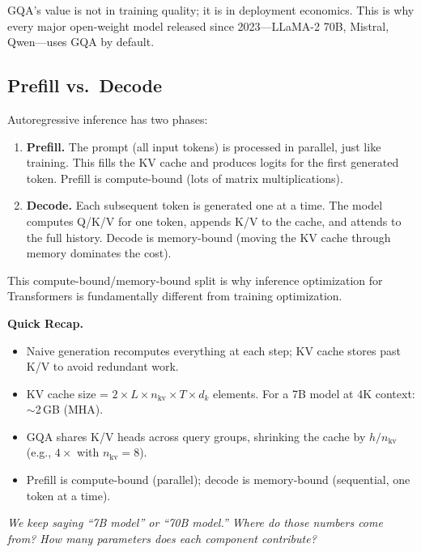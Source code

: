 GQA's value is not in training quality; it is in deployment economics. This is why every major open-weight model released since 2023---LLaMA-2 70B, Mistral, Qwen---uses GQA by default.

\subsection{Prefill vs.\ Decode}

Autoregressive inference has two phases:

\begin{enumerate}[nosep]
  \item \textbf{Prefill.} The prompt (all input tokens) is processed in parallel, just like training. This fills the KV cache and produces logits for the first generated token. Prefill is compute-bound (lots of matrix multiplications).
  \item \textbf{Decode.} Each subsequent token is generated one at a time. The model computes Q/K/V for one token, appends K/V to the cache, and attends to the full history. Decode is memory-bound (moving the KV cache through memory dominates the cost).
\end{enumerate}

This compute-bound/memory-bound split is why inference optimization for Transformers is fundamentally different from training optimization.

\begin{quickrecap}
\textbf{Quick Recap.}
\begin{itemize}[nosep,leftmargin=1.5em]
  \item Naive generation recomputes everything at each step; KV cache stores past K/V to avoid redundant work.
  \item KV cache size = $2 \times L \times n_\text{kv} \times T \times d_k$ elements. For a 7B model at 4K context: $\sim$2\,GB (MHA).
  \item GQA shares K/V heads across query groups, shrinking the cache by $h / n_\text{kv}$ (e.g., $4\times$ with $n_\text{kv} = 8$).
  \item Prefill is compute-bound (parallel); decode is memory-bound (sequential, one token at a time).
\end{itemize}
\textit{We keep saying ``7B model'' or ``70B model.'' Where do those numbers come from? How many parameters does each component contribute?}
\end{quickrecap}



